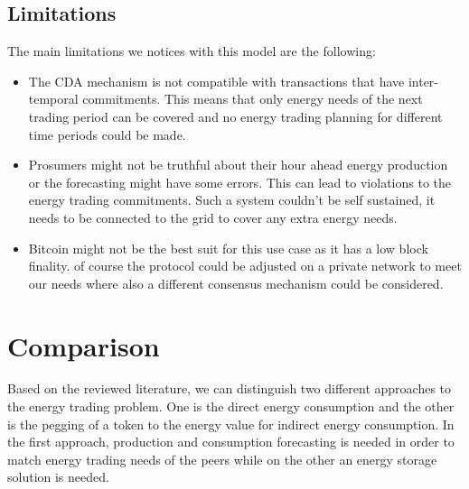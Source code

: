 \subsection{Limitations}
The main limitations we notices with this model are the following:
\begin{itemize}
    \item The CDA mechanism is not compatible with transactions that have inter-temporal commitments. This means that only energy needs of the next trading period can be covered
          and no energy trading planning for different time periods could be made.
    \item Prosumers might not be truthful about their hour ahead energy production or the forecasting might have some errors. This can lead to violations to the energy trading
          commitments. Such a system couldn't be self sustained, it needs to be connected to the grid to cover any extra energy needs.
    \item  Bitcoin might not be the best suit for this use case as it has a low block finality. of course the protocol could be adjusted on a private network to meet our needs
          where also a different consensus mechanism could be considered.
\end{itemize}

\section{Comparison}
\label{sec:comp}
Based on the reviewed literature, we can distinguish two different approaches to the energy trading problem.
One is the direct energy consumption and the other is the pegging of a token to the energy value for indirect energy consumption.
In the first approach, production and consumption forecasting is needed in order to match
energy trading needs of the peers while on the other an energy storage solution is needed.

